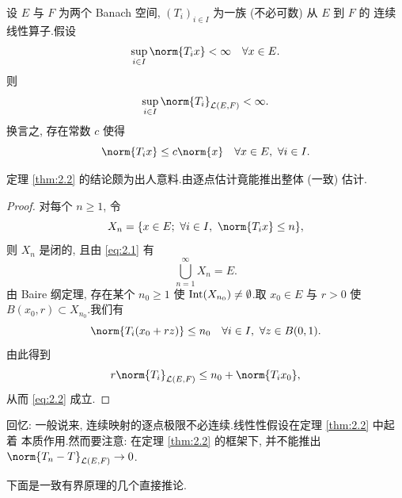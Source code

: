 \begin{keytheorem}
\label{thm:2.2}
设 $E$ 与 $F$ 为两个 Banach 空间, $(T_i)_{i\in I}$ 为一族 (不必可数) 从 $E$ 到 $F$ 的
连续线性算子.假设
\begin{equation}
\sup_{i\in I}\norm{T_ix}<\infty\quad \forall x\in E.
\label{eq:2.1}
\end{equation}
则
\begin{equation}
\sup_{i\in I}\norm{T_i}_{\LL(E,F)}<\infty.
\label{eq:2.2}
\end{equation}
换言之, 存在常数 $c$ 使得
\begin{equation*}
\norm{T_ix}\le c\norm{x}\quad \forall x\in E,\ \forall i\in I.
\end{equation*}
\end{keytheorem}

\begin{remark}
\label{rem:2.2}
定理  \ref{thm:2.2} 的结论颇为出人意料.由逐点估计竟能推出整体 (一致) 估计.
\end{remark}

\begin{proof}
对每个 $n\ge1$, 令
\begin{equation*}
X_n=\{x\in E;\ \forall i\in I,\ \norm{T_ix}\le n\},
\end{equation*}
则 $X_n$ 是闭的, 且由 \eqref{eq:2.1} 有
\begin{equation*}
\bigcup_{n=1}^\infty X_n=E.
\end{equation*}
由 Baire 纲定理, 存在某个 $n_0\ge1$ 使 $\operatorname{Int}(X_{n_0})\ne\emptyset$.取 $x_0\in E$ 与
$r>0$ 使 $B(x_0,r)\subset X_{n_0}$.我们有
\begin{equation*}
\norm{T_i(x_0+rz)}\le n_0\quad \forall i\in I,\ \forall z\in B(0,1).
\end{equation*}
由此得到
\begin{equation*}
r\norm{T_i}_{\LL(E,F)}\le n_0+\norm{T_ix_0},
\end{equation*}
从而 \eqref{eq:2.2} 成立.
\end{proof}

\begin{remark}
\label{rem:2.3}
回忆: 一般说来, 连续映射的逐点极限不必连续.线性性假设在定理  \ref{thm:2.2} 中起着
本质作用.然而要注意: 在定理  \ref{thm:2.2} 的框架下, 并不能推出
$\norm{T_n-T}_{\LL(E,F)}\to0$.
\end{remark}

下面是一致有界原理的几个直接推论.

